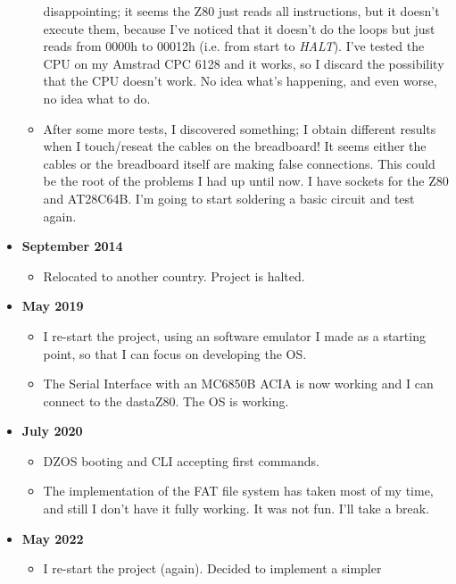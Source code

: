 \documentclass[a4paper,11pt]{article}
\begin{document}
\begin{itemize}
\begin{itemize}
            disappointing; it seems the Z80 just reads all instructions, but it
            doesn't execute them, because I've noticed that it doesn't do the
            loops but just reads from 0000h to 00012h (i.e. from start to
            \textit{HALT}). I've tested the CPU on my Amstrad CPC 6128 and it
            works, so I discard the possibility that the CPU doesn't work. No
            idea what's happening, and even worse, no idea what to do. 
            \item After some more tests, I discovered something; I obtain
            different results when I touch/reseat the cables on the breadboard!
            It seems either the cables or the breadboard itself are making false
            connections. This could be the root of the problems I had up until
            now. I have sockets for the Z80 and AT28C64B. I'm going to start
            soldering a basic circuit and test again.
        \end{itemize}
        \item \textbf{September 2014}
        \begin{itemize}
            \item Relocated to another country. Project is halted.
        \end{itemize}
        \item \textbf{May 2019}
        \begin{itemize}
            \item I re-start the project, using an software emulator I made as a
            starting point, so that I can focus on developing the OS.
            \item The Serial Interface with an MC6850B ACIA is now working and I
            can connect to the dastaZ80. The OS is working.
        \end{itemize}
        \item \textbf{July 2020}
        \begin{itemize}
            \item DZOS booting and CLI accepting first commands.
            \item The implementation of the FAT file system has taken most of my
            time, and still I don't have it fully working. It was not fun. I'll
            take a break.
        \end{itemize}
        \item \textbf{May 2022}
        \begin{itemize}
            \item I re-start the project (again). Decided to implement a simpler

\end{itemize}
\end{itemize}
\end{document}
